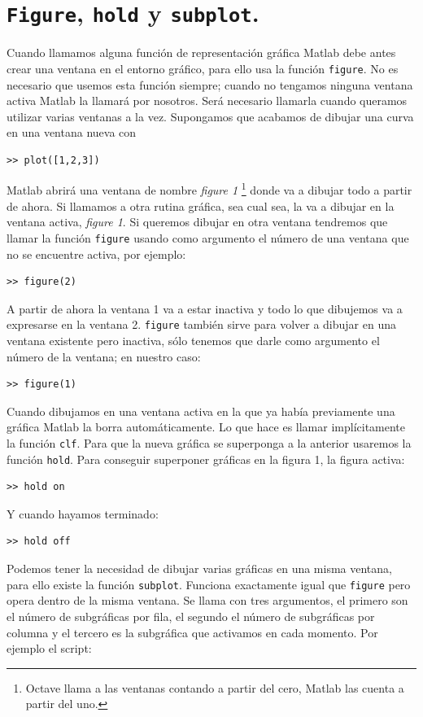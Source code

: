 \section{\texttt{Figure}, \texttt{hold} y
  \texttt{subplot}.}

Cuando llamamos alguna función de representación gráfica Matlab debe
antes crear una ventana en el entorno gráfico, para ello usa la
función \texttt{figure}. No es necesario que usemos esta función
siempre; cuando no tengamos ninguna ventana activa Matlab la llamará
por nosotros.  Será necesario llamarla cuando queramos utilizar varias
ventanas a la vez. Supongamos que acabamos de dibujar una curva en una
ventana nueva con

\begin{verbatim}
>> plot([1,2,3])
\end{verbatim}
Matlab abrirá una ventana de nombre \emph{figure 1}%
\footnote{Octave llama a las ventanas contando a partir del cero, Matlab las
cuenta a partir del uno.%
} donde va a dibujar todo a partir de ahora. Si llamamos a otra rutina
gráfica, sea cual sea, la va a dibujar en la ventana activa, \emph{figure
1}. Si queremos dibujar en otra ventana tendremos que llamar la función
\texttt{figure} usando como argumento el número de una ventana que
no se encuentre activa, por ejemplo:

\begin{verbatim}
>> figure(2)
\end{verbatim}
A partir de ahora la ventana 1 va a estar inactiva y todo lo que
dibujemos va a expresarse en la ventana 2. \texttt{figure} también
sirve para volver a dibujar en una ventana existente pero inactiva,
sólo tenemos que darle como argumento el número de la ventana; en
nuestro caso:

\begin{verbatim}
>> figure(1)
\end{verbatim}
Cuando dibujamos en una ventana activa en la que ya había previamente
una gráfica Matlab la borra automáticamente. Lo que hace es llamar
implícitamente la función \texttt{clf}. Para que la nueva gráfica se
superponga a la anterior usaremos la función \texttt{hold}. Para
conseguir superponer gráficas en la figura 1, la figura activa:

\begin{verbatim}
>> hold on
\end{verbatim}
Y cuando hayamos terminado:

\begin{verbatim}
>> hold off
\end{verbatim}
Podemos tener la necesidad de dibujar varias gráficas en una misma
ventana, para ello existe la función \texttt{subplot}. Funciona
exactamente igual que \texttt{figure} pero opera dentro de la misma
ventana. Se llama con tres argumentos, el primero son el número de
subgráficas por fila, el segundo el número de subgráficas por columna
y el tercero es la subgráfica que activamos en cada momento. Por
ejemplo el script:

